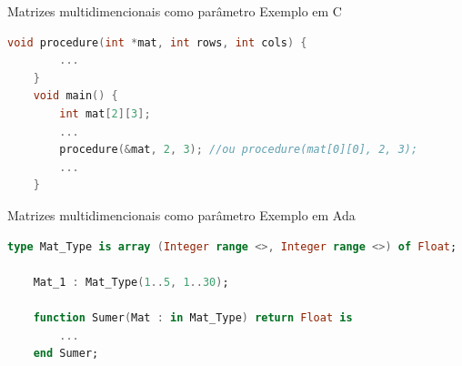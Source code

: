 \begin{frame}[fragile]{Matrizes multidimencionais como parâmetro}
	Exemplo em C
	\begin{lstlisting}[language=c]		
	void procedure(int *mat, int rows, int cols) {
	    ...
	}
	void main() {
	    int mat[2][3];
	    ...
	    procedure(&mat, 2, 3); //ou procedure(mat[0][0], 2, 3);
	    ...
	}
	\end{lstlisting}	
\end{frame}

\begin{frame}[fragile]{Matrizes multidimencionais como parâmetro}
	Exemplo em Ada
	\begin{lstlisting}[language=ada]		
	type Mat_Type is array (Integer range <>, Integer range <>) of Float;

	Mat_1 : Mat_Type(1..5, 1..30);

	function Sumer(Mat : in Mat_Type) return Float is
	    ...
	end Sumer;
	\end{lstlisting}	
\end{frame}